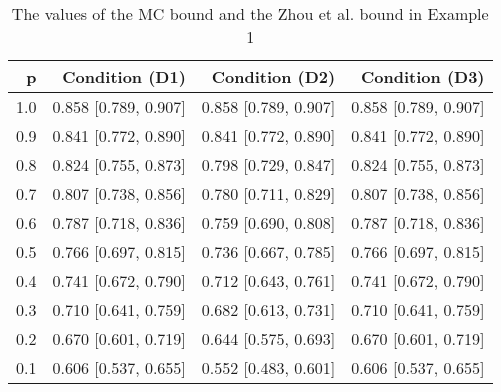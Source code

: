 \begin{table}

\caption{\label{tab:tab1}The values of the MC bound and the Zhou et al. bound in Example 1}
\centering
\begin{tabular}[t]{rrrr}
\toprule
p & Condition (D1) & Condition (D2) & Condition (D3)\\
\midrule
1.0 & 0.858 [0.789, 0.907] & 0.858 [0.789, 0.907] & 0.858 [0.789, 0.907]\\
0.9 & 0.841 [0.772, 0.890] & 0.841 [0.772, 0.890] & 0.841 [0.772, 0.890]\\
0.8 & 0.824 [0.755, 0.873] & 0.798 [0.729, 0.847] & 0.824 [0.755, 0.873]\\
0.7 & 0.807 [0.738, 0.856] & 0.780 [0.711, 0.829] & 0.807 [0.738, 0.856]\\
0.6 & 0.787 [0.718, 0.836] & 0.759 [0.690, 0.808] & 0.787 [0.718, 0.836]\\
0.5 & 0.766 [0.697, 0.815] & 0.736 [0.667, 0.785] & 0.766 [0.697, 0.815]\\
0.4 & 0.741 [0.672, 0.790] & 0.712 [0.643, 0.761] & 0.741 [0.672, 0.790]\\
0.3 & 0.710 [0.641, 0.759] & 0.682 [0.613, 0.731] & 0.710 [0.641, 0.759]\\
0.2 & 0.670 [0.601, 0.719] & 0.644 [0.575, 0.693] & 0.670 [0.601, 0.719]\\
0.1 & 0.606 [0.537, 0.655] & 0.552 [0.483, 0.601] & 0.606 [0.537, 0.655]\\
\bottomrule
\end{tabular}
\end{table}
